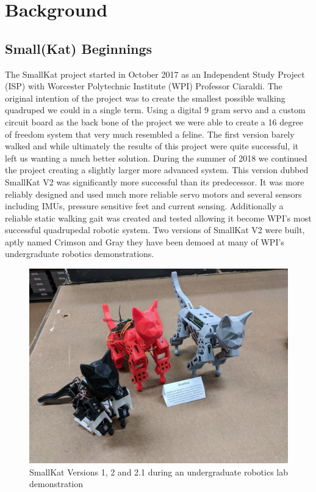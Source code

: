 \graphicspath{ {./figures/} }
\section{Background}
\label{chap:background}
\subsection{Small(Kat) Beginnings}
 The SmallKat project started in October 2017 as an Independent Study Project (ISP) with Worcester Polytechnic Institute (WPI) Professor Ciaraldi. The original intention of the project was to create the smallest possible walking quadruped we could in a single term. Using a digital 9 gram servo and a custom circuit board as the back bone of the project we were able to create a 16 degree of freedom system that very much resembled a feline. The first version barely walked and while ultimately the results of this project were quite successful, it left us wanting a much better solution. During the summer of 2018 we continued the project creating a slightly larger more advanced system. This version dubbed SmallKat V2 was significantly more successful than its predecessor. It was more reliably designed and used much more reliable servo motors and several sensors including IMUs, pressure sensitive feet and current sensing. Additionally a reliable static walking gait was created and tested allowing it become WPI's most successful quadrupedal robotic system. Two versions of SmallKat V2 were built, aptly named Crimson and Gray they have been demoed at many of WPI's undergraduate robotics demonstrations. 
     \begin{figure}[H]
        \centering
        \includegraphics[width=120mm]{figures/V1andV2.jpg}
        \caption{SmallKat Versions 1, 2 and 2.1 during an undergraduate robotics lab demonstration}
        \label{fig:my_label}
    \end{figure}
